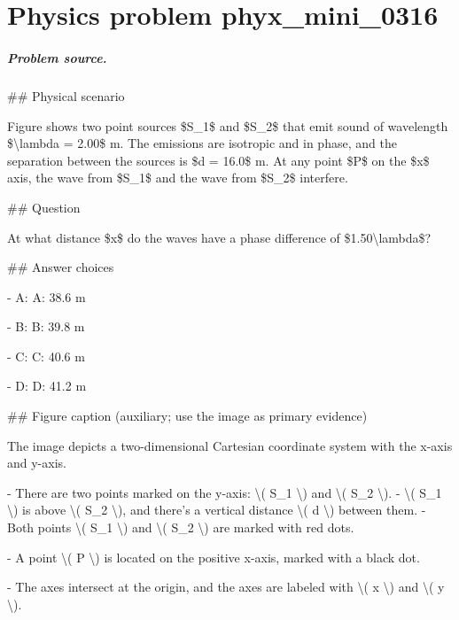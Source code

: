 
\chapter{Physics problem phyx\_mini\_0316}
\label{ch:PhyXMiniProblems_problem_phyx_mini_0316}

\paragraph{Problem source.}
\#\# Physical scenario

Figure shows two point sources \$S\_1\$ and \$S\_2\$ that emit sound of wavelength \$\textbackslash{}lambda = 2.00\$ m. The emissions are isotropic and in phase, and the separation between the sources is \$d = 16.0\$ m. At any point \$P\$ on the \$x\$ axis, the wave from \$S\_1\$ and the wave from \$S\_2\$ interfere.

\#\# Question

At what distance \$x\$ do the waves have a phase difference of \$1.50\textbackslash{}lambda\$?

\#\# Answer choices

- A: A: 38.6 m

- B: B: 39.8 m

- C: C: 40.6 m

- D: D: 41.2 m

\#\# Figure caption (auxiliary; use the image as primary evidence)

The image depicts a two-dimensional Cartesian coordinate system with the x-axis and y-axis. 

- There are two points marked on the y-axis: \textbackslash{}( S\_1 \textbackslash{}) and \textbackslash{}( S\_2 \textbackslash{}). 
  - \textbackslash{}( S\_1 \textbackslash{}) is above \textbackslash{}( S\_2 \textbackslash{}), and there's a vertical distance \textbackslash{}( d \textbackslash{}) between them.
  - Both points \textbackslash{}( S\_1 \textbackslash{}) and \textbackslash{}( S\_2 \textbackslash{}) are marked with red dots.

- A point \textbackslash{}( P \textbackslash{}) is located on the positive x-axis, marked with a black dot.

- The axes intersect at the origin, and the axes are labeled with \textbackslash{}( x \textbackslash{}) and \textbackslash{}( y \textbackslash{}).

